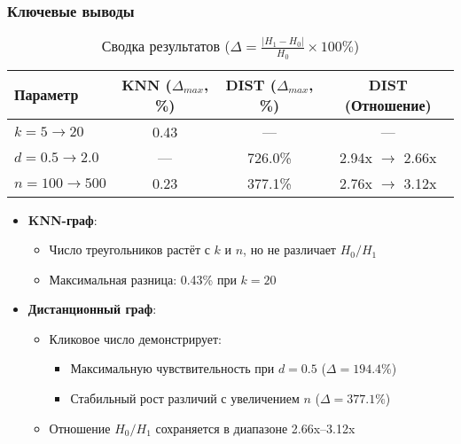\documentclass[a4paper, 12pt]{article}
\begin{document}
\subsubsection*{Ключевые выводы}
\begin{table}[H]
    \centering
    \begin{tabular}{|l|c|c|c|}
        \hline
        \textbf{Параметр} & \textbf{KNN (\(\Delta_{max}\), \%)} & \textbf{DIST (\(\Delta_{max}\), \%)} & \textbf{DIST (Отношение)} \\ \hline
        \(k=5 \to 20\) & 0.43 & — & — \\ 
        \(d=0.5 \to 2.0\) & — & 726.0\% & 2.94x \(\to\) 2.66x \\ 
        \(n=100 \to 500\) & 0.23 & 377.1\% & 2.76x \(\to\) 3.12x \\ \hline
    \end{tabular}
    \caption{Сводка результатов (\(\Delta = \frac{|H_1 - H_0|}{H_0} \times 100\%\))}
    \label{tab:exp2_summary}
\end{table}

\begin{itemize}
    \item \textbf{KNN-граф}:
        \begin{itemize}
            \item Число треугольников растёт с \(k\) и \(n\), но не различает \(H_0/H_1\)
            \item Максимальная разница: 0.43\% при \(k=20\)
        \end{itemize}

    \item \textbf{Дистанционный граф}:
        \begin{itemize}
            \item Кликовое число демонстрирует:
                \begin{itemize}
                    \item Максимальную чувствительность при \(d=0.5\) (\(\Delta=194.4\%\))
                    \item Стабильный рост различий с увеличением \(n\) (\(\Delta=377.1\%\))
                \end{itemize}
            \item Отношение \(H_0/H_1\) сохраняется в диапазоне 2.66x–3.12x
        \end{itemize}
\end{itemize}
\end{document}
